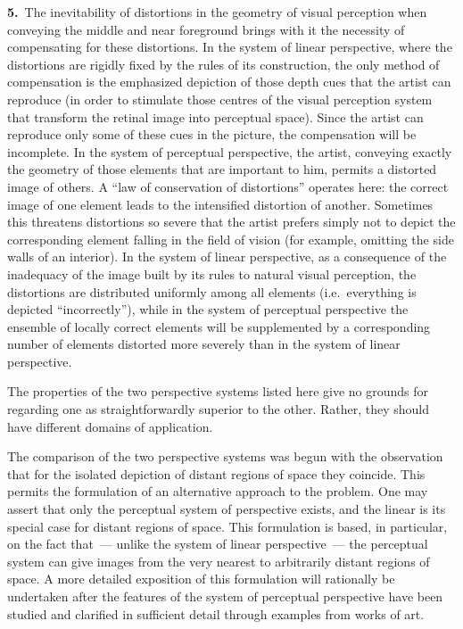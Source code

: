 \medskip
\noindent\textbf{5.}~The inevitability of distortions in the geometry of visual perception
when conveying the middle and near foreground brings with it the necessity of
compensating for these distortions.  In the system of linear perspective, where the
distortions are rigidly fixed by the rules of its construction, the only method of
compensation is the emphasized depiction of those depth cues that the artist can
reproduce (in order to stimulate those centres of the visual perception system that
transform the retinal image into perceptual space).  Since the artist can reproduce only
some of these cues in the picture, the compensation will be incomplete.  In the system
of perceptual perspective, the artist, conveying exactly the geometry of those elements
that are important to him, permits a distorted image of others.  A ``law of conservation
of distortions'' operates here: the correct image of one element leads to the intensified
distortion of another.  Sometimes this threatens distortions so severe that the artist
prefers simply not to depict the corresponding element falling in the field of vision (for
example, omitting the side walls of an interior).  In the system of linear perspective,
as a consequence of the inadequacy of the image built by its rules to natural visual
perception, the distortions are distributed uniformly among all elements (i.e.\ everything
is depicted ``incorrectly''), while in the system of perceptual perspective the ensemble
of locally correct elements will be supplemented by a corresponding number of elements
distorted more severely than in the system of linear perspective.


The properties of the two perspective systems listed here give no grounds for regarding
one as straightforwardly superior to the other.  Rather, they should have different
domains of application.

The comparison of the two perspective systems was begun with the observation that for
the isolated depiction of distant regions of space they coincide.  This permits the
formulation of an alternative approach to the problem.  One may assert that only the
perceptual system of perspective exists, and the linear is its special case for distant
regions of space.  This formulation is based, in particular, on the fact that~--- unlike the
system of linear perspective~--- the perceptual system can give images from the very
nearest to arbitrarily distant regions of space.  A more detailed exposition of this
formulation will rationally be undertaken after the features of the system of perceptual
perspective have been studied and clarified in sufficient detail through examples from
works of art.

